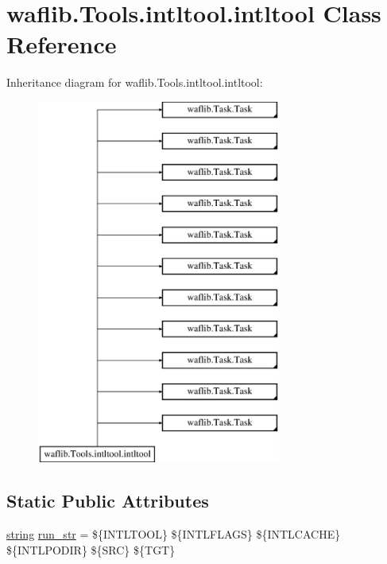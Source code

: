 \hypertarget{classwaflib_1_1_tools_1_1intltool_1_1intltool}{}\section{waflib.\+Tools.\+intltool.\+intltool Class Reference}
\label{classwaflib_1_1_tools_1_1intltool_1_1intltool}
Inheritance diagram for waflib.\+Tools.\+intltool.\+intltool\+:\begin{figure}[H]
\begin{center}
\leavevmode
\includegraphics[height=12.000000cm]{classwaflib_1_1_tools_1_1intltool_1_1intltool}
\end{center}
\end{figure}
\subsection*{Static Public Attributes}
\begin{DoxyCompactItemize}
\item 
\hyperlink{test__lib_f_l_a_c_2format_8c_ab02026ad0de9fb6c1b4233deb0a00c75}{string} \hyperlink{classwaflib_1_1_tools_1_1intltool_1_1intltool_ae5d29c979d1f65ebd2094e89f0e58474}{run\+\_\+str} = \textquotesingle{}\$\{I\+N\+T\+L\+T\+O\+OL\} \$\{I\+N\+T\+L\+F\+L\+A\+GS\} \$\{I\+N\+T\+L\+C\+A\+C\+HE\} \$\{I\+N\+T\+L\+P\+O\+D\+IR\} \$\{S\+RC\} \$\{T\+GT\}\textquotesingle{}
\end{DoxyCompactItemize}
